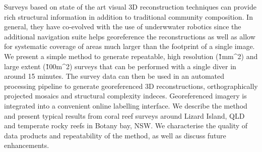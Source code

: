 Surveys based on state of the art visual 3D reconstruction techniques can provide rich structural information in addition to traditional community composition. In general, they have co-evolved with the use of underwwater robotics since the additional navigation suite helps georeference the reconstructions as well as allow for systematic coverage of areas much larger than the footprint of a single image. We present a simple method to generate repeatable, high resolution (\~1mm^{2}) and large extent (\~100m^{2}) surveys that can be performed with a single diver in around 15 minutes. The survey data can then be used in an automated processing pipeline to generate georeferenced 3D reconstructions, orthographically projected mosaics and structural complexity indeces. Georeferenced imagery is integrated into a convenient online labelling interface. 
We describe the method and present typical results from coral reef surveys around Lizard Island, QLD and temperate rocky reefs in Botany bay, NSW. We characterise the quality of data products and repeatability of the method, as well as discuss future enhancements.